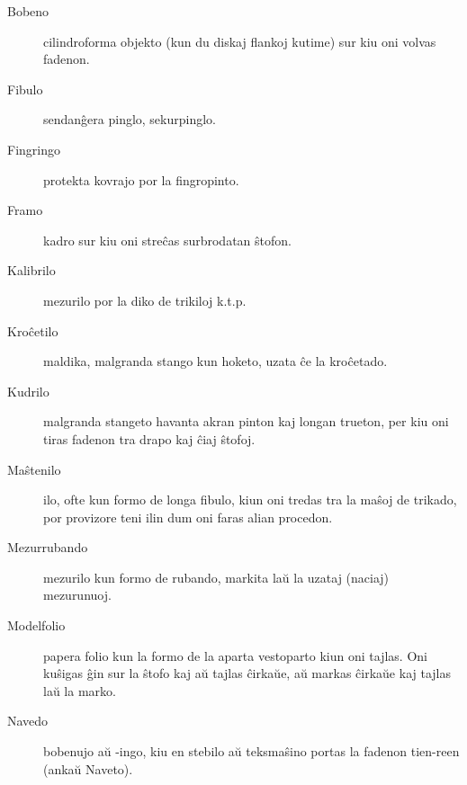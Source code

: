 \begin{description}
\item[Bobeno]

 cilindroforma objekto (kun du diskaj flankoj kutime) sur kiu oni volvas fadenon.

\item[Fibulo]

 sendanĝera pinglo, sekurpinglo.

\item[Fingringo]

 protekta kovrajo por la fingropinto.

\item[Framo]

 kadro sur kiu oni streĉas surbrodatan ŝtofon.

\item[Kalibrilo]

 mezurilo por la diko de trikiloj k.t.p.

\item[Kroĉetilo]

 maldika, malgranda stango kun hoketo, uzata ĉe la kroĉetado.

\item[Kudrilo]

 malgranda stangeto havanta akran pinton kaj longan trueton, per kiu oni tiras fadenon tra drapo kaj ĉiaj ŝtofoj.

\item[Maŝtenilo]

 ilo, ofte kun formo de longa fibulo, kiun oni tredas tra la maŝoj de trikado, por provizore teni ilin dum oni faras alian procedon.

\item[Mezurrubando]

 mezurilo kun formo de rubando, markita laŭ la uzataj (naciaj) mezurunuoj.

\item[Modelfolio]

 papera folio kun la formo de la aparta vestoparto kiun oni tajlas. Oni kuŝigas ĝin sur la ŝtofo kaj aŭ tajlas ĉirkaŭe, aŭ markas ĉirkaŭe kaj tajlas laŭ la marko.

\item[Navedo]

 bobenujo aŭ -ingo, kiu en stebilo aŭ teksmaŝino portas la fadenon tien-reen (ankaŭ Naveto).


\end{description}
